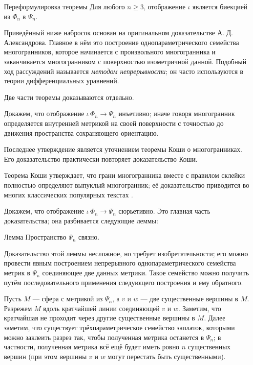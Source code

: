 \documentclass[oneside,a4paper]{article}
\begin{document}
\begin{thm}{Переформулировка теоремы}
Для любого $n\ge 3$,
отображение $\iota$ является биекцией из $\Phi_n$ в $\Psi_n$.
\end{thm}

Приведённый ниже набросок основан на оригинальном доказательстве А. Д. Александрова.
Главное в нём это построение однопараметрического семейства многогранников, которое начинается с произвольного многогранника и заканчивается многогранником с поверхностью изометричной данной.  
Подобный ход рассуждений называется \emph{методом непрерывности};
он часто используются в теории дифференциальных уравнений.

\medskip

Две части теоремы доказываются отдельно.

 Докажем, что отображение $\iota\:\Phi_n\to\Psi_n$ инъетивно; иначе говоря многогранник определяется внутренней метрикой на своей поверхности с точностью до движения пространства сохраняющего ориентацию.

Последнее утверждение является уточнением теоремы Коши о многогранниках. 
Его доказательство практически повторяет доказательство Коши.

Теорема Коши утверждает, что грани многогранника вместе с правилом склейки полностью определяют выпуклый многогранник;
её доказательство приводится во многих классических популярных текстах \cite{aigner-zigler,dolbilin,tabacnikov-fuks}.

\medskip

 Докажем, что отображение $\iota\:\Phi_n\to\Psi_n$ сюрьетивно.
Это главная часть доказательства; она разбивается следующие леммы:

\begin{thm}{Лемма}
Пространство $\Psi_n$ связно.
\end{thm}

Доказательство этой леммы несложное, но требует изобретательности; 
его можно провести явным построением непрерывного однопараметрического семейства  метрик в $\Psi_n$ соединяющее две данных метрики.
Такое семейство можно получить путём последовательного применения следующего построения и ему обратного.

Пусть $M$ --- сфера с метрикой из $\Psi_n$, а $v$ и $w$ --- две существенные вершины в $M$.
Разрежем $M$ вдоль кратчайшей линии соединяющей $v$ и $w$. 
Заметим, что кратчайшая не проходит через другие существенные вершины в $M$.
Далее заметим, что существует трёхпараметрическое семейство заплаток, которыми можно заклеить разрез так, чтобы полученная метрика останется в $\Psi_n$; 
в частности, полученная метрика всё ещё будет иметь ровно $n$ существенных вершин (при этом вершины $v$ и $w$ могут перестать быть существенными).
\end{document}
